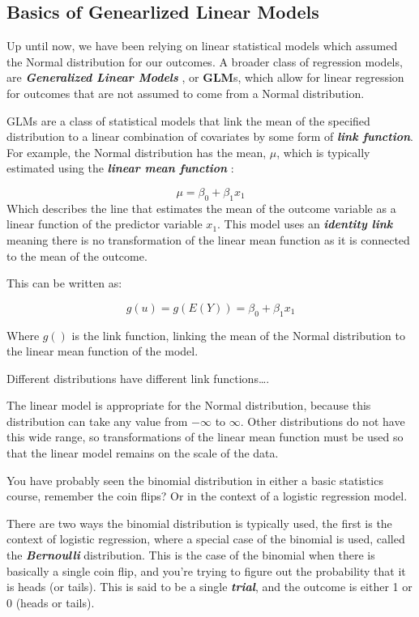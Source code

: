 \documentclass[
]{article}
\begin{document}
\newpage

\hypertarget{basics-of-genearlized-linear-models}{%
\subsection{Basics of Genearlized Linear Models}\label{basics-of-genearlized-linear-models}}

Up until now, we have been relying on linear statistical models which assumed the Normal distribution for our outcomes. A broader class of regression models, are \textbf{\emph{Generalized Linear Models}} \citep{nelder_generalized_1972, mccullagh_generalized_1998}, or \textbf{GLM}s, which allow for linear regression for outcomes that are not assumed to come from a Normal distribution.

GLMs are a class of statistical models that link the mean of the specified distribution to a linear combination of covariates by some form of \textbf{\emph{link function}}. For example, the Normal distribution has the mean, \(\mu\), which is typically estimated using the \textbf{\emph{linear mean function}} :

\[\mu = \beta_0 + \beta_1 x_1\] Which describes the line that estimates the mean of the outcome variable as a linear function of the predictor variable \(x_1\). This model uses an \textbf{\emph{identity link}} meaning there is no transformation of the linear mean function as it is connected to the mean of the outcome.

This can be written as:

\[g(u) = g(E(Y)) = \beta_0 + \beta_1 x_1\]

Where \(g()\) is the link function, linking the mean of the Normal distribution to the linear mean function of the model.

Different distributions have different link functions\ldots.

The linear model is appropriate for the Normal distribution, because this distribution can take any value from \(- \infty\) to \(\infty\). Other distributions do not have this wide range, so transformations of the linear mean function must be used so that the linear model remains on the scale of the data.

You have probably seen the binomial distribution in either a basic statistics course, remember the coin flips? Or in the context of a logistic regression model.

There are two ways the binomial distribution is typically used, the first is the context of logistic regression, where a special case of the binomial is used, called the \textbf{\emph{Bernoulli}} distribution. This is the case of the binomial when there is basically a single coin flip, and you're trying to figure out the probability that it is heads (or tails). This is said to be a single \textbf{\emph{trial}}, and the outcome is either 1 or 0 (heads or tails).
\end{document}
